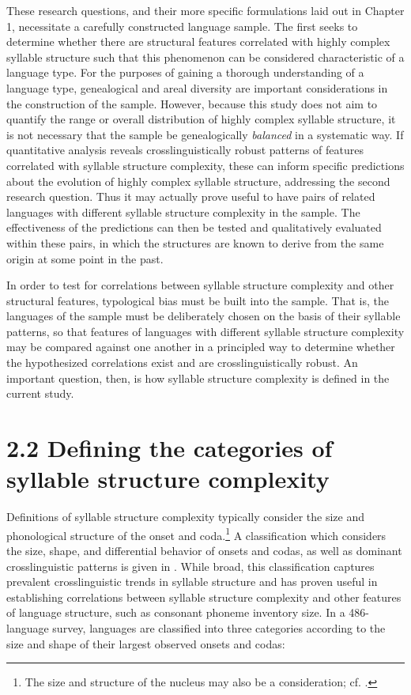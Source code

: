   These research questions, and their more specific formulations laid out in Chapter 1, necessitate a carefully constructed language sample. The first seeks to determine whether there are structural features correlated with highly complex syllable structure such that this phenomenon can be considered characteristic of a language type. For the purposes of gaining a thorough understanding of a language type, genealogical and areal diversity are important considerations in the construction of the sample. However, because this study does not aim to quantify the range or overall distribution of highly complex syllable structure, it is not necessary that the sample be genealogically \textit{balanced} in a systematic way. If quantitative analysis reveals crosslinguistically robust patterns of features correlated with syllable structure complexity, these can inform specific predictions about the evolution of highly complex syllable structure, addressing the second research question. Thus it may actually prove useful to have pairs of related languages with different syllable structure complexity in the sample. The effectiveness of the predictions can then be tested and qualitatively evaluated within these pairs, in which the structures are known to derive from the same origin at some point in the past.

  In order to test for correlations between syllable structure complexity and other structural features, typological bias \citep[12]{Comrie1989} must be built into the sample. That is, the languages of the sample must be deliberately chosen on the basis of their syllable patterns, so that features of languages with different syllable structure complexity may be compared against one another in a principled way to determine whether the hypothesized correlations exist and are crosslinguistically robust. An important question, then, is how syllable structure complexity is defined in the current study.

\section{2.2 Defining the categories of syllable structure complexity}

  Definitions of syllable structure complexity typically consider the size and phonological structure of the onset and coda.\footnote{ \textrm{The size and structure of the nucleus may also be a consideration; cf. \citet{MaddiesonEtAl2013}.}} A classification which considers the size, shape, and differential behavior of onsets and codas, as well as dominant crosslinguistic patterns is given in \citet{Maddieson2013a}. While broad, this classification captures prevalent crosslinguistic trends in syllable structure and has proven useful in establishing correlations between syllable structure complexity and other features of language structure, such as consonant phoneme inventory size. In a 486-language survey, languages are classified into three categories according to the size and shape of their largest observed onsets and codas: 

